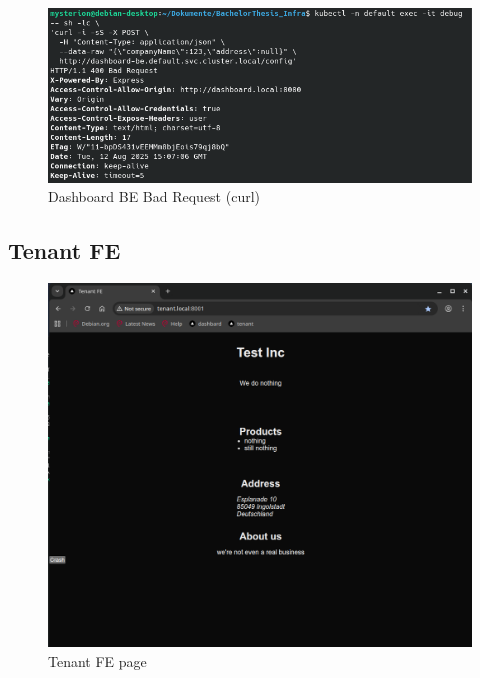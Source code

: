 \documentclass[11pt, a4paper, oneside, listof=totoc]{scrartcl}
\begin{document}
                \begin{figure}[h!]
                    \centering
                    \includegraphics[width=\textwidth]{screenshots/eval/dashboardbe/dashboardbe-bad-request.png}
                    \caption{Dashboard BE Bad Request (curl)}\label{fig:dashboardbe-bad-request}
                \end{figure}

        \clearpage

            \FloatBarrier
            \subsection{Tenant FE}\label{appsub:tenantfe}
                \begin{figure}[h!]
                    \centering
                    \includegraphics[width=\textwidth]{screenshots/eval/tenantfe/tenantfe.png}
                    \caption{Tenant FE page}\label{fig:tenantfe-page}
                \end{figure}
\end{document}
